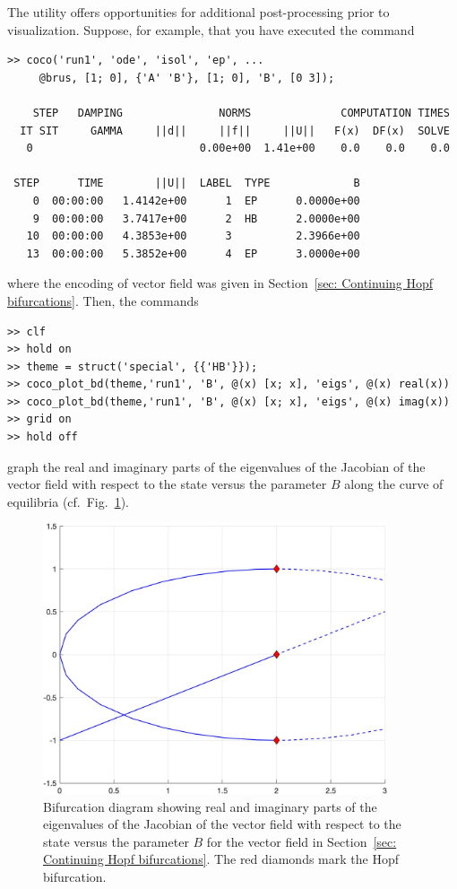 The  utility offers opportunities for additional post-processing prior to visualization. Suppose, for example, that you have executed the command
\begin{lstlisting}[language=coco-highlight,frame=lines]
>> coco('run1', 'ode', 'isol', 'ep', ...
     @brus, [1; 0], {'A' 'B'}, [1; 0], 'B', [0 3]);

    STEP   DAMPING               NORMS              COMPUTATION TIMES
  IT SIT     GAMMA     ||d||     ||f||     ||U||   F(x)  DF(x)  SOLVE
   0                          0.00e+00  1.41e+00    0.0    0.0    0.0

 STEP      TIME        ||U||  LABEL  TYPE             B
    0  00:00:00   1.4142e+00      1  EP      0.0000e+00
    9  00:00:00   3.7417e+00      2  HB      2.0000e+00
   10  00:00:00   4.3853e+00      3          2.3966e+00
   13  00:00:00   5.3852e+00      4  EP      3.0000e+00
\end{lstlisting} 
where the encoding of vector field was given in Section~\ref{sec: Continuing Hopf bifurcations}. Then, the commands
\begin{lstlisting}[language=coco-highlight,frame=lines]
>> clf
>> hold on
>> theme = struct('special', {{'HB'}});
>> coco_plot_bd(theme,'run1', 'B', @(x) [x; x], 'eigs', @(x) real(x))
>> coco_plot_bd(theme,'run1', 'B', @(x) [x; x], 'eigs', @(x) imag(x))
>> grid on
>> hold off
\end{lstlisting}
graph the real and imaginary parts of the eigenvalues of the Jacobian of the vector field with respect to the state versus the parameter $B$ along the curve of equilibria (cf.\ Fig.~\ref{fig: Section5_1_1}).
\begin{figure}[h]
\centering
\includegraphics[width=4in]{Figures/Section5_1_1.jpg}
\caption{Bifurcation diagram showing real and imaginary parts of the eigenvalues of the Jacobian of the vector field with respect to the state versus the parameter $B$ for the vector field in Section~\ref{sec: Continuing Hopf bifurcations}. The red diamonds mark the Hopf bifurcation.}
\label{fig: Section5_1_1}
\end{figure}
